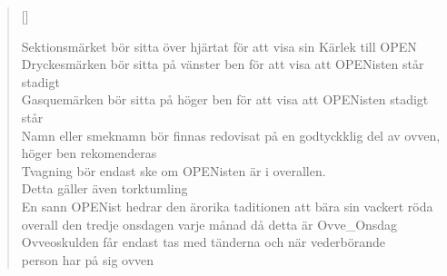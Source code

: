 
\settowidth{\versewidth}{Sektionsmärket bör sitt över hjärtat för att visa sin kärlek till OPEN}



\begin{verse}[\versewidth]


Sektionsmärket bör sitta över hjärtat för att visa sin Kärlek till OPEN\\
Dryckesmärken bör sitta på vänster ben för att visa att OPENisten står stadigt\\
Gasquemärken bör sitta på höger ben för att visa att OPENisten stadigt står\\
Namn eller smeknamn bör finnas redovisat på en godtyckklig del av ovven,\\
höger ben rekomenderas\\
Tvagning bör endast ske om OPENisten är i overallen.\\
Detta gäller även torktumling\\
En sann OPENist hedrar den ärorika taditionen att bära sin vackert röda\\
overall den tredje onsdagen varje månad då detta är Ovve_Onsdag\\
Ovveoskulden får endast tas med tänderna och när vederbörande\\
person har på sig ovven\\




\end{verse}

